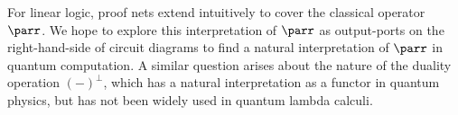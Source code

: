 \documentclass{article}
\begin{document}
For linear logic, proof nets extend intuitively to cover the classical operator $\parr$.
We hope to explore this interpretation of $\parr$ as output-ports on the right-hand-side 
of circuit diagrams to find a natural interpretation of $\parr$ in quantum computation.
A similar question arises about the nature of the duality operation $(-)^\bot$,
which has a natural interpretation as a functor in quantum physics, but has not been
widely used in quantum lambda calculi.




\end{document}
